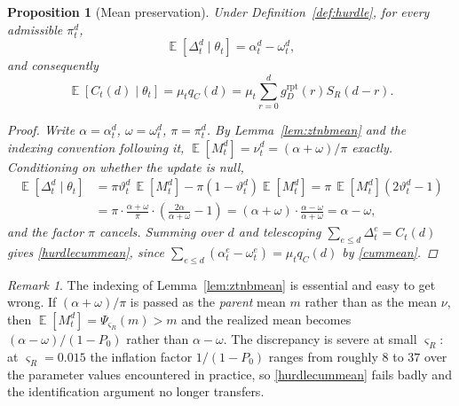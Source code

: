 \documentclass{article}
\newtheorem{proposition}{Proposition}
\theoremstyle{definition}
\theoremstyle{remark}
\newtheorem{remark}{Remark}
\newcommand{\E}{\operatorname{\mathbb{E}}}
\begin{document}
\begin{proposition}[Mean preservation]\label{prop:hurdlemean}
Under Definition~\ref{def:hurdle}, for every admissible $\pi_t^d$,
\begin{equation}\label{hurdlemean}
    \E[\Delta_t^d\mid\theta_t]
    =
    \alpha_t^d-\omega_t^d,
\end{equation}
and consequently
\begin{equation}\label{hurdlecummean}
    \E[C_t(d)\mid\theta_t]
    =
    \mu_t q_C(d)
    =
    \mu_t\sum_{r=0}^{d}g_D^{\mathrm{rpt}}(r)S_R(d-r).
\end{equation}
\begin{proof}
Write $\alpha=\alpha_t^d$, $\omega=\omega_t^d$, $\pi=\pi_t^d$. By
Lemma~\ref{lem:ztnbmean} and the indexing convention following it,
$\E[M_t^d]=\nu_t^d=(\alpha+\omega)/\pi$ exactly. Conditioning on whether the
update is null,
\begin{equation}
\begin{split}
    \E[\Delta_t^d\mid\theta_t]
    &=
    \pi\vartheta_t^d\,\E[M_t^d]
    -
    \pi\left(1-\vartheta_t^d\right)\E[M_t^d]
    =
    \pi\,\E[M_t^d]\left(2\vartheta_t^d-1\right)\\
    &=
    \pi\cdot\frac{\alpha+\omega}{\pi}
    \cdot
    \left(\frac{2\alpha}{\alpha+\omega}-1\right)
    =
    (\alpha+\omega)\cdot\frac{\alpha-\omega}{\alpha+\omega}
    =
    \alpha-\omega,
\end{split}
\end{equation}
and the factor $\pi$ cancels. Summing over $d$ and telescoping
$\sum_{e\leq d}\Delta_t^e=C_t(d)$ gives \eqref{hurdlecummean}, since
$\sum_{e\leq d}(\alpha_t^e-\omega_t^e)=\mu_t q_C(d)$ by \eqref{cummean}.
\end{proof}
\end{proposition}

\begin{remark}
The indexing of Lemma~\ref{lem:ztnbmean} is essential and easy to get wrong. If
$(\alpha+\omega)/\pi$ is passed as the \emph{parent} mean $m$ rather than as the
mean $\nu$, then $\E[M_t^d]=\Psi_{\varsigma_R}(m)>m$ and the realized mean
becomes $(\alpha-\omega)/\left(1-P_0\right)$ rather than $\alpha-\omega$. The
discrepancy is severe at small $\varsigma_R$: at $\varsigma_R=0.015$ the
inflation factor $1/(1-P_0)$ ranges from roughly $8$ to $37$ over the parameter
values encountered in practice, so \eqref{hurdlecummean} fails badly and the
identification argument no longer transfers.
\end{remark}
\end{document}
